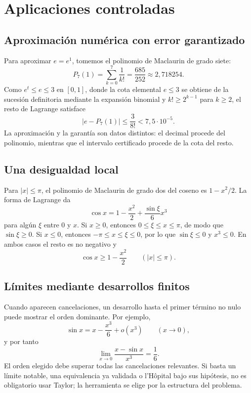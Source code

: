 \section{Aplicaciones controladas}
\label{sec:aplicaciones-taylor}

\subsection{Aproximación numérica con error garantizado}

Para aproximar \(e=e^1\), tomemos el polinomio de Maclaurin de grado siete:
\[
  P_7(1)=\sum_{k=0}^{7}\frac1{k!}
        =\frac{685}{252}
        \approx 2{,}718254.
\]
Como \(e^t\le e\le3\) en \([0,1]\), donde la cota elemental \(e\le3\) se
obtiene de la sucesión definitoria mediante la expansión binomial y
\(k!\ge2^{k-1}\) para \(k\ge2\), el resto de Lagrange satisface
\[
  |e-P_7(1)|\le\frac{3}{8!}<7{,}5\cdot10^{-5}.
\]
La aproximación y la garantía son datos distintos: el decimal procede del
polinomio, mientras que el intervalo certificado procede de la cota del
resto.

\subsection{Una desigualdad local}

Para \(|x|\le\pi\), el polinomio de Maclaurin de grado dos del coseno es
\(1-x^2/2\). La forma de Lagrange da
\[
  \cos x=1-\frac{x^2}{2}+\frac{\sin\xi}{6}x^3
\]
para algún \(\xi\) entre \(0\) y \(x\). Si \(x\ge0\), entonces
\(0\le\xi\le x\le\pi\), de modo que \(\sin\xi\ge0\). Si \(x\le0\),
entonces \(-\pi\le x\le\xi\le0\), por lo que \(\sin\xi\le0\) y
\(x^3\le0\). En ambos casos el resto es no negativo y
\[
  \cos x\ge1-\frac{x^2}{2}
  \qquad (|x|\le\pi).
\]

\subsection{Límites mediante desarrollos finitos}

Cuando aparecen cancelaciones, un desarrollo hasta el primer término no nulo
puede mostrar el orden dominante. Por ejemplo,
\[
  \sin x=x-\frac{x^3}{6}+o(x^3)
  \qquad(x\to0),
\]
y por tanto
\[
  \lim_{x\to0}\frac{x-\sin x}{x^3}=\frac16.
\]
El orden elegido debe superar todas las cancelaciones relevantes. Si basta
un límite notable, una equivalencia ya validada o l'Hôpital bajo sus
hipótesis, no es obligatorio usar Taylor; la herramienta se elige por la
estructura del problema.

